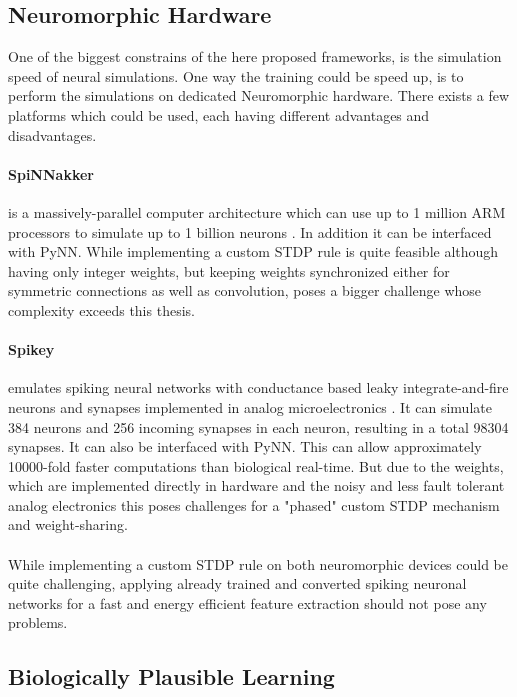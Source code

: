 \subsection{Neuromorphic Hardware} \label{c:neuhard}

One of the biggest constrains of the here proposed frameworks, is the simulation speed of neural simulations.
One way the training could be speed up, is to perform the simulations on dedicated Neuromorphic hardware. 
There exists a few platforms which could be used, each having different advantages and disadvantages.

\paragraph{SpiNNakker} \label{c:spinnakker}
is a massively-parallel computer architecture which can use up to 1 million ARM processors to simulate up to 1 billion neurons \cite{jin2008efficient}. 
In addition it can be interfaced with PyNN. 
While implementing a custom STDP rule is quite feasible although having only integer weights, but keeping weights synchronized either for symmetric connections as well as convolution, poses a bigger challenge whose complexity exceeds this thesis.

\paragraph{Spikey} \label{c:spikey}
emulates spiking neural networks with conductance based leaky integrate-and-fire neurons and synapses implemented in analog microelectronics \cite{Pfeil1311}.
It can simulate 384 neurons and 256 incoming synapses in each neuron, resulting in a total 98304 synapses.
It can also be interfaced with PyNN.
This can allow approximately 10000-fold faster computations than biological real-time.
But due to the weights, which are implemented directly in hardware and the noisy and less fault tolerant analog electronics this poses challenges for a "phased" custom STDP mechanism and weight-sharing. 
\\
\\
While implementing a custom STDP rule on both neuromorphic devices could be quite challenging, applying already trained and converted spiking neuronal networks for a fast and energy efficient feature extraction should not pose any problems.  

\subsection{Biologically Plausible Learning} \label{c:biofuture}

